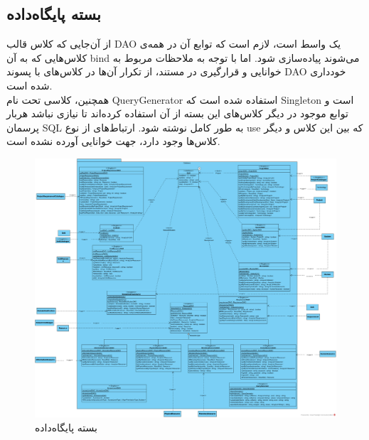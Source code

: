 \begin{landscape}
\section{بسته پایگاه‌داده}
از آن‌جایی که کلاس قالب
 DAO یک واسط است، لازم است که توابع آن در همه‌ی کلاس‌هایی که به آن bind می‌شوند پیاده‌سازی شود. اما با توجه به ملاحظات مربوط به خوانایی و قرارگیری در مستند، از تکرار آن‌ها در کلاس‌های با پسوند DAO خودداری شده است.
 \\
 همچنین، کلاسی تحت نام QueryGenerator استفاده شده است که Singleton است و توابع موجود در دیگر کلاس‌های این بسته از آن استفاده کرده‌اند تا نیازی نباشد هربار پرسمان SQL به طور کامل نوشته شود. ارتباط‌های از نوع use که بین این کلاس و دیگر کلاس‌ها وجود دارد، جهت خوانایی آورده نشده است.
\begin{figure}[H]
	\centering
	\includegraphics[scale=0.4]{img/class-design/DatabasePackage}
	\caption{بسته پایگاه‌داده}
\end{figure}
\end{landscape}


